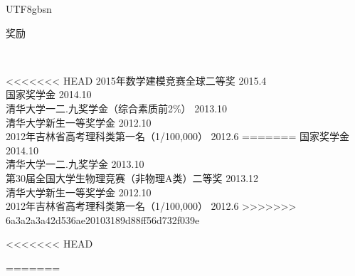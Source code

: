 \documentclass[9pt]{article}
\newenvironment{changemargin}[2]{%
  \begin{list}{}{%
    \setlength{\topsep}{0pt}%
    \setlength{\leftmargin}{#1}%
    \setlength{\rightmargin}{#2}%
    \setlength{\listparindent}{\parindent}%
    \setlength{\itemindent}{\parindent}%
    \setlength{\parsep}{\parskip}%
  }%
  \item[]}{\end{list}
}
\newcommand{\lineover}{
    \begin{changemargin}{-0.05in}{-0.05in}
        \vspace*{-8pt}
        \hrulefill \\
        \vspace*{-2pt}
    \end{changemargin}
}
\newcommand{\header}[1]{
    \begin{changemargin}{-0.5in}{-0.5in}
        \scshape{#1}\\
    \lineover
    \end{changemargin}
}
\newenvironment{body} {
    \vspace*{-16pt}
    \begin{changemargin}{-0.25in}{-0.5in}
  } 
    {\end{changemargin}
}
\begin{document}
\begin{CJK*}{UTF8}{gbsn}
\begin{body}
\end{body}
\smallskip
\smallskip

\header{奖励}

\begin{body}
<<<<<<< HEAD
    \vspace{14pt}
    2015年数学建模竞赛全球二等奖 \hfill{} 2015.4\\
    \smallskip
    国家奖学金 \hfill{} 2014.10\\
    \smallskip
    清华大学一二.九奖学金（综合素质前2\%） \hfill{} 2013.10\\
    \smallskip
    清华大学新生一等奖学金 \hfill{} 2012.10\\
    \smallskip
    2012年吉林省高考理科类第一名（1/100,000） \hfill{} 2012.6
=======
	\vspace{14pt}
	国家奖学金 \hfill{} 2014.10\\
	\smallskip
	清华大学一二.九奖学金 \hfill{} 2013.10\\
	\smallskip
	第30届全国大学生物理竞赛（非物理A类）二等奖 \hfill{} 2013.12\\
	
	\smallskip
	清华大学新生一等奖学金 \hfill{} 2012.10\\
	\smallskip
	2012年吉林省高考理科类第一名（1/100,000） \hfill{} 2012.6
>>>>>>> 6a3a2a3a42d536ae20103189d88ff56d732f039e
\end{body}

\smallskip
\smallskip


<<<<<<< HEAD

=======


\end{CJK*}
\end{document}

